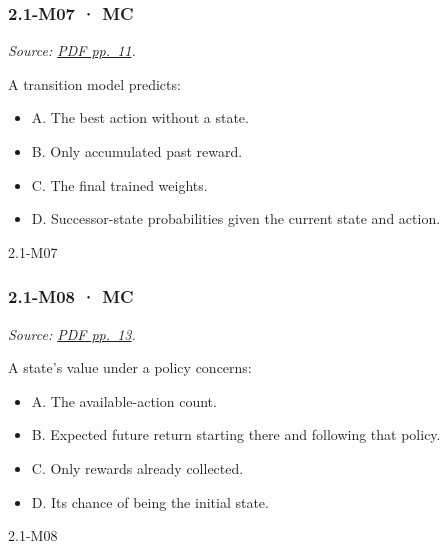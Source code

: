 \noindent\begin{minipage}{\linewidth}

\subsubsection{2.1-M07 · MC}\label{m07-mc-3}

\emph{Source:
\href{../Lecture\%20Slides/2.1.\%20Introduction\%20to\%20Reinforcement\%20Learning.pdf\#page=11}{PDF
pp.~11}.}

A transition model predicts:

\begin{itemize}
\tightlist
\item
  A. The best action without a state.
\item
  B. Only accumulated past reward.
\item
  C. The final trained weights.
\item
  D. Successor-state probabilities given the current state and action.
\end{itemize}

\begin{solution}[8mm]{2.1-M07}

\end{solution}
\end{minipage}\par\medskip

\noindent\begin{minipage}{\linewidth}

\subsubsection{2.1-M08 · MC}\label{m08-mc-3}

\emph{Source:
\href{../Lecture\%20Slides/2.1.\%20Introduction\%20to\%20Reinforcement\%20Learning.pdf\#page=13}{PDF
pp.~13}.}

A state's value under a policy concerns:

\begin{itemize}
\tightlist
\item
  A. The available-action count.
\item
  B. Expected future return starting there and following that policy.
\item
  C. Only rewards already collected.
\item
  D. Its chance of being the initial state.
\end{itemize}

\begin{solution}[8mm]{2.1-M08}

\end{solution}
\end{minipage}\par\medskip

